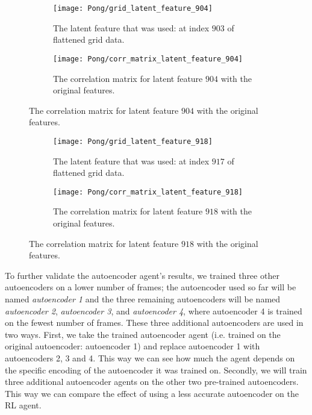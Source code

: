 \begin{figure}[h]
	\centering
	\begin{subfigure}[b]{0.2\textwidth}
		\texttt{[image: Pong/grid\_latent\_feature\_904]}
		\caption{The latent feature that was used: at index $903$ of flattened grid data.}
		\label{fig:ae-latent-feature-pong} 
	\end{subfigure}\hfill
	\begin{subfigure}[b]{0.75\textwidth}
		\texttt{[image: Pong/corr\_matrix\_latent\_feature\_904]}
		\caption{The correlation matrix for latent feature $904$ with the original features.}
		\label{fig:ae-latent-feature-corr-matrix-pong}
	\end{subfigure}
	\caption{The correlation matrix for latent feature $904$ with the original features.}
	\label{fig:latent-feature-corr-pong}
\end{figure}

\begin{figure}[h]
	\centering
	\begin{subfigure}[b]{0.2\textwidth}
		\texttt{[image: Pong/grid\_latent\_feature\_918]}
		\caption{The latent feature that was used: at index $917$ of flattened grid data.}
		\label{fig:ae-latent-feature-pong2} 
	\end{subfigure}\hfill
	\begin{subfigure}[b]{0.75\textwidth}
		\texttt{[image: Pong/corr\_matrix\_latent\_feature\_918]}
		\caption{The correlation matrix for latent feature $918$ with the original features.}
		\label{fig:ae-latent-feature-corr-matrix-pong2}
	\end{subfigure}
	\caption{The correlation matrix for latent feature $918$ with the original features.}
	\label{fig:latent-feature-corr-pong2}
\end{figure}

To further validate the autoencoder agent's results, we trained three other autoencoders on a lower number of frames; the autoencoder used so far will be named \emph{autoencoder 1} and the three remaining autoencoders will be named \emph{autoencoder 2}, \emph{autoencoder 3}, and \emph{autoencoder 4}, where autoencoder 4 is trained on the fewest number of frames. These three additional autoencoders are used in two ways. First, we take the trained autoencoder agent (i.e. trained on the original autoencoder: autoencoder 1) and replace autoencoder 1 with autoencoders 2, 3 and 4. This way we can see how much the agent depends on the specific encoding of the autoencoder it was trained on. Secondly, we will train three additional autoencoder agents on the other two pre-trained autoencoders. This way we can compare the effect of using a less accurate autoencoder on the RL agent.

